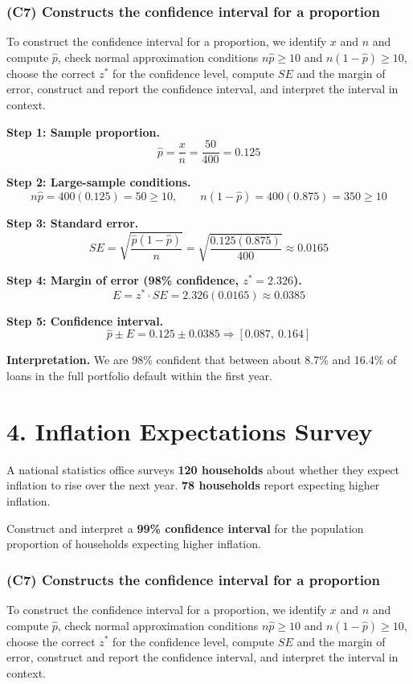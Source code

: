 	\subsubsection*{(C7) Constructs the confidence interval for a proportion}
	To construct the confidence interval for a proportion, we identify \(x\) and \(n\) and compute \(\hat{p}\), check normal approximation conditions \(n\hat{p} \ge 10\) and \(n(1-\hat{p}) \ge 10\), choose the correct \(z^*\) for the confidence level, compute \(SE\) and the margin of error, construct and report the confidence interval, and interpret the interval in context.
	
	\textbf{Step 1: Sample proportion.}
	\[
	\hat{p} = \frac{x}{n} = \frac{50}{400} = 0.125
	\]
	
	\textbf{Step 2: Large-sample conditions.}
	\[
	n\hat{p} = 400(0.125) = 50 \ge 10, \qquad n(1-\hat{p}) = 400(0.875) = 350 \ge 10
	\]
	
	\textbf{Step 3: Standard error.}
	\[
	SE = \sqrt{\frac{\hat{p}(1-\hat{p})}{n}} = \sqrt{\frac{0.125(0.875)}{400}} \approx 0.0165
	\]
	
	\textbf{Step 4: Margin of error (98\% confidence, \(z^* = 2.326\)).}
	\[
	E = z^* \cdot SE = 2.326(0.0165) \approx 0.0385
	\]
	
	\textbf{Step 5: Confidence interval.}
	\[
	\hat{p} \pm E = 0.125 \pm 0.0385 \Rightarrow [0.087,\ 0.164]
	\]
	
	\textbf{Interpretation.}
	We are 98\% confident that between about 8.7\% and 16.4\% of loans in the full portfolio default within the first year.
	
	\section*{4. Inflation Expectations Survey}
	
	A national statistics office surveys \textbf{120 households} about whether they expect inflation to rise over the next year. \textbf{78 households} report expecting higher inflation.
	
	Construct and interpret a \textbf{99\% confidence interval} for the population proportion of households expecting higher inflation.
	
	\subsubsection*{(C7) Constructs the confidence interval for a proportion}
	To construct the confidence interval for a proportion, we identify \(x\) and \(n\) and compute \(\hat{p}\), check normal approximation conditions \(n\hat{p} \ge 10\) and \(n(1-\hat{p}) \ge 10\), choose the correct \(z^*\) for the confidence level, compute \(SE\) and the margin of error, construct and report the confidence interval, and interpret the interval in context.
	
